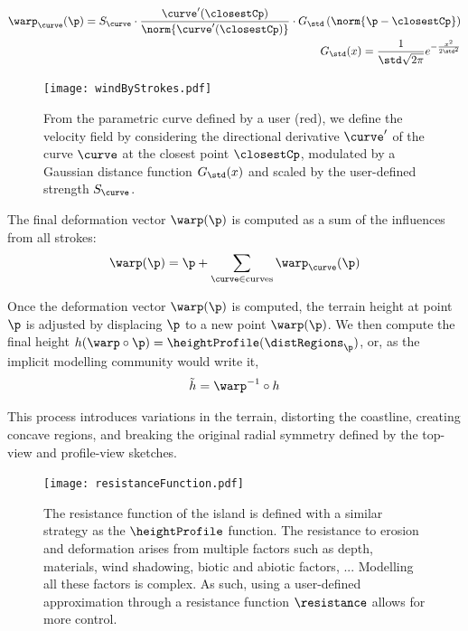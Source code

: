 \begin{align}
    \warp_\curve(\p) = S_\curve \cdot \frac{\curve'(\closestCp)}{\norm{\curve'(\closestCp)} } \cdot G_\std\left(\norm{\p - \closestCp} \right) \\
    G_\std(x) = \frac{1}{\std \sqrt{2\pi}} e^{-\frac{x^2}{2 \std^2}}
\end{align}

\begin{figure}
    \texttt{[image: windByStrokes.pdf]}
    \caption{From the parametric curve defined by a user (red), we define the velocity field by considering the directional derivative $\curve'$ of the curve $\curve$ at the closest point $\closestCp$, modulated by a Gaussian distance function $G_{\std}(x)$ and scaled by the user-defined strength $S_\curve$.}
    \label{fig:coral-island-wind-from-strokes}
\end{figure}

The final deformation vector $\warp(\p)$ is computed as a sum of the influences from all strokes: 
\begin{align}
    \warp(\p) = \p + \sum_{\curve \in \text{curves}} \warp_\curve(\p) 
\end{align}

Once the deformation vector $\warp(\p)$ is computed, the terrain height at point $\p$ is adjusted by displacing $\p$ to a new point $\warp(\p)$.
We then compute the final height $h(\warp \circ \p) = \heightProfile(\distRegions_{\p})$, or, as the implicit modelling community would write it,
\begin{align}
    \Tilde{h} = \warp^{-1} \circ h
\end{align}

This process introduces variations in the terrain, distorting the coastline, creating concave regions, and breaking the original radial symmetry defined by the top-view and profile-view sketches.

\begin{figure}
    \texttt{[image: resistanceFunction.pdf]}
    \caption{The resistance function of the island is defined with a similar strategy as the $\heightProfile$ function. The resistance to erosion and deformation arises from multiple factors such as depth, materials, wind shadowing, biotic and abiotic factors, ... Modelling all these factors is complex. As such, using a user-defined approximation through a resistance function $\resistance$ allows for more control.}
    \label{fig:coral-island-resistance-function}
\end{figure}

